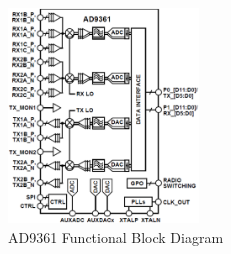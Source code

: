 %
%
%
\begin{figure}[htbp]
    \centering
    \includegraphics[width=0.45\textwidth]{./figures/ad9361_functional_diagram}
    \caption{ AD9361 Functional Block Diagram
    \label{fig:ad9361func}}
\end{figure}

